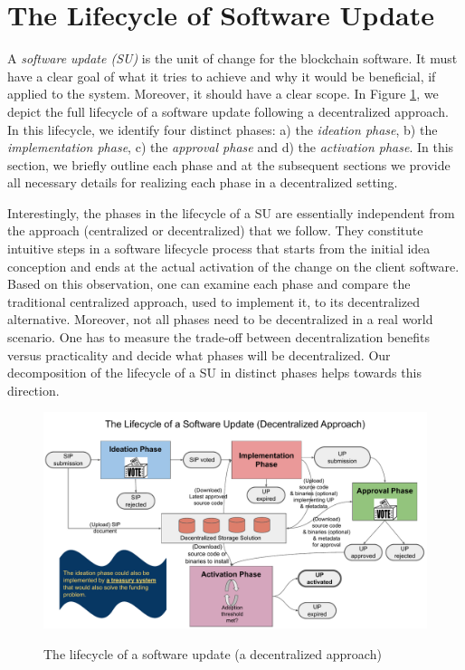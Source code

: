 \section{The Lifecycle of Software Update}
A \emph{software update (SU)} is the unit of change for the blockchain software. It must have a clear goal of what it tries to achieve and why it would be beneficial, if applied to the system. Moreover, it should have a clear scope. In Figure \ref{lifecycle}, we depict the full lifecycle of a software update following a decentralized approach.
In this lifecycle, we identify four distinct phases: a) the \emph{ideation phase}, b) the \emph{implementation phase}, c) the \emph{approval phase} and d) the \emph{activation phase}. In this section, we briefly outline each phase and at the subsequent sections we provide all necessary details for realizing each phase in a decentralized setting.

Interestingly, the phases in the lifecycle of a SU are essentially independent from the approach (centralized or decentralized) that we follow. They constitute intuitive steps in a software lifecycle process that starts from the initial idea conception and ends at the actual activation of the change on the client software. Based on this observation, one can examine each phase and compare the traditional centralized approach, used to implement it, to its decentralized alternative. Moreover, not all phases need to be decentralized in a real world scenario. One has to measure the trade-off between decentralization benefits versus practicality and decide what phases will be decentralized. Our decomposition of the lifecycle of a SU in distinct phases helps towards this direction.

\begin{figure}[H]
    \caption{The lifecycle of a software update (a decentralized approach)}
    \centering
    \includegraphics[width=0.9 \columnwidth,keepaspectratio]{figures/lifecycle_phases.pdf}
    \label{lifecycle}
\end{figure}

